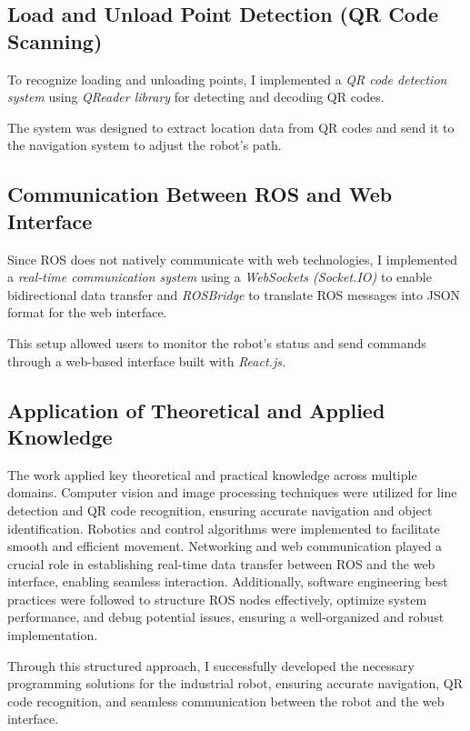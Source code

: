 \documentclass[a4paper,12pt]{extreport}
\begin{document}
\subsection{Load and Unload Point Detection (QR Code Scanning)}

To recognize loading and unloading points, I implemented a \emph{QR code
detection system} using \emph{QReader library} for detecting and
decoding QR codes.

The system was designed to extract location data from QR codes and send
it to the navigation system to adjust the robot's path.

\subsection{Communication Between ROS and Web Interface}

Since ROS does not natively communicate with web technologies, I
implemented a \emph{real-time communication system} using a
\emph{WebSockets (Socket.IO)} to enable bidirectional data transfer and
\emph{ROSBridge} to translate ROS messages into JSON format for the web
interface.

This setup allowed users to monitor the robot's status and send commands
through a web-based interface built with \emph{React.js.}

\subsection{Application of Theoretical and Applied Knowledge}
The work applied key theoretical and practical knowledge across multiple
domains. Computer vision and image processing techniques were utilized
for line detection and QR code recognition, ensuring accurate navigation
and object identification. Robotics and control algorithms were
implemented to facilitate smooth and efficient movement. Networking and
web communication played a crucial role in establishing real-time data
transfer between ROS and the web interface, enabling seamless
interaction. Additionally, software engineering best practices were
followed to structure ROS nodes effectively, optimize system
performance, and debug potential issues, ensuring a well-organized and
robust implementation.

Through this structured approach, I successfully developed the necessary
programming solutions for the industrial robot, ensuring accurate
navigation, QR code recognition, and seamless communication between the
robot and the web interface.
\end{document}
